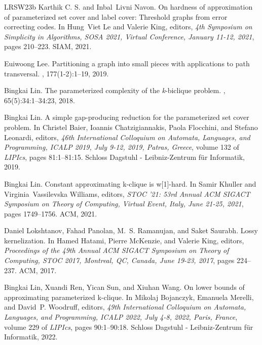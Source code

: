 \documentclass[10pt,a4paper]{article}
\begin{document}
\begin{thebibliography}{LRSW23b}
{Karthik {C. S.}} and Inbal~Livni Navon.
\newblock On hardness of approximation of parameterized set cover and label
  cover: Threshold graphs from error correcting codes.
\newblock In Hung~Viet Le and Valerie King, editors, {\em 4th Symposium on
  Simplicity in Algorithms, {SOSA} 2021, Virtual Conference, January 11-12,
  2021}, pages 210--223. {SIAM}, 2021.

Euiwoong Lee.
\newblock Partitioning a graph into small pieces with applications to path
  transversal.
, 177(1-2):1--19, 2019.

Bingkai Lin.
\newblock The parameterized complexity of the \emph{k}-biclique problem.
, 65(5):34:1--34:23, 2018.

Bingkai Lin.
\newblock A simple gap-producing reduction for the parameterized set cover
  problem.
\newblock In Christel Baier, Ioannis Chatzigiannakis, Paola Flocchini, and
  Stefano Leonardi, editors, {\em 46th International Colloquium on Automata,
  Languages, and Programming, {ICALP} 2019, July 9-12, 2019, Patras, Greece},
  volume 132 of {\em LIPIcs}, pages 81:1--81:15. Schloss Dagstuhl -
  Leibniz-Zentrum f{\"{u}}r Informatik, 2019.

Bingkai Lin.
\newblock Constant approximating k-clique is w[1]-hard.
\newblock In Samir Khuller and Virginia~Vassilevska Williams, editors, {\em
  {STOC} '21: 53rd Annual {ACM} {SIGACT} Symposium on Theory of Computing,
  Virtual Event, Italy, June 21-25, 2021}, pages 1749--1756. {ACM}, 2021.

Daniel Lokshtanov, Fahad Panolan, M.~S. Ramanujan, and Saket Saurabh.
\newblock Lossy kernelization.
\newblock In Hamed Hatami, Pierre McKenzie, and Valerie King, editors, {\em
  Proceedings of the 49th Annual {ACM} {SIGACT} Symposium on Theory of
  Computing, {STOC} 2017, Montreal, QC, Canada, June 19-23, 2017}, pages
  224--237. {ACM}, 2017.

Bingkai Lin, Xuandi Ren, Yican Sun, and Xiuhan Wang.
\newblock On lower bounds of approximating parameterized k-clique.
\newblock In Mikolaj Bojanczyk, Emanuela Merelli, and David~P. Woodruff,
  editors, {\em 49th International Colloquium on Automata, Languages, and
  Programming, {ICALP} 2022, July 4-8, 2022, Paris, France}, volume 229 of {\em
  LIPIcs}, pages 90:1--90:18. Schloss Dagstuhl - Leibniz-Zentrum f{\"{u}}r
  Informatik, 2022.


\end{thebibliography}
\end{document}

